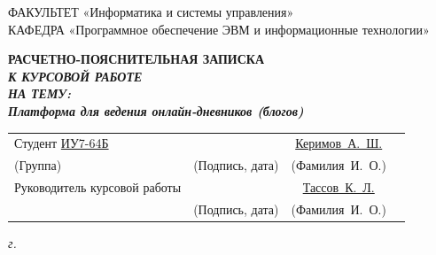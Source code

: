 \begin{titlepage}
	{\doublespacing\small\raggedright
		ФАКУЛЬТЕТ \hspace{28mm} «Информатика и системы управления» \\
		КАФЕДРА \hspace{9mm} «Программное обеспечение ЭВМ и информационные технологии» \\
	}

	\vspace{20mm}

	{\large\bfseries
		РАСЧЕТНО-ПОЯСНИТЕЛЬНАЯ ЗАПИСКА \\
		{\itshape
			К КУРСОВОЙ РАБОТЕ \\
			НА ТЕМУ: \\
			Платформа для ведения онлайн-дневников (блогов)
		}
	}

	\vspace{70mm}

	\begin{tabular}{p{} c c c}
		Студент \underline{ ИУ7-64Б }          & \underline{\hspace{35mm}}     & \underline{Керимов~А.~Ш.}     \\ [-0.6em]
		{\hspace{23.5mm} \scriptsize (Группа)} & {\scriptsize (Подпись, дата)} & {\scriptsize (Фамилия~И.~О.)} \\
		Руководитель курсовой работы           & \underline{\hspace{35mm}}     & \underline{ Тассов~К.~Л. }    \\ [-0.6em]
		                                       & {\scriptsize (Подпись, дата)} & {\scriptsize (Фамилия~И.~О.)} \\
	\end{tabular}

	\vfill

	\textit{{\the\year} г.}
\end{titlepage}

\setcounter{page}{2}
